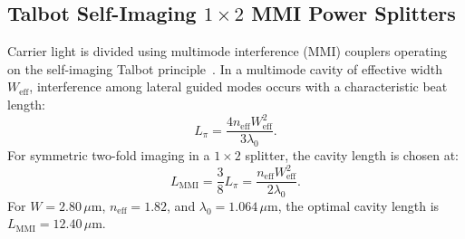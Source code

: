 \documentclass[journal]{IEEEtran}
\begin{document}
\subsection{Talbot Self-Imaging $1 \times 2$ MMI Power Splitters}
Carrier light is divided using multimode interference (MMI) couplers operating on the self-imaging Talbot principle~\cite{soldano1995optical}. In a multimode cavity of effective width $W_{\text{eff}}$, interference among lateral guided modes occurs with a characteristic beat length:
\begin{equation}
    L_\pi = \frac{4 n_{\text{eff}} W_{\text{eff}}^2}{3 \lambda_0}.
\end{equation}
For symmetric two-fold imaging in a $1 \times 2$ splitter, the cavity length is chosen at:
\begin{equation}
    L_{\text{MMI}} = \frac{3}{8} L_\pi = \frac{n_{\text{eff}} W_{\text{eff}}^2}{2 \lambda_0}.
\end{equation}
For $W = 2.80\,\mu\text{m}$, $n_{\text{eff}} = 1.82$, and $\lambda_0 = 1.064\,\mu\text{m}$, the optimal cavity length is $L_{\text{MMI}} = 12.40\,\mu\text{m}$.
\end{document}
